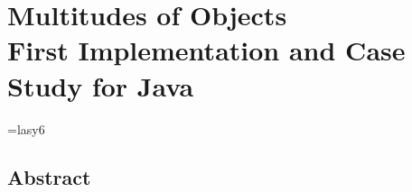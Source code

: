 \chapter[Multitudes of Objects: First Implementation and Case Study for Java]{\texorpdfstring{%
Multitudes of Objects\\{\Large{}First Implementation and Case Study for Java}}{%
Concurrent Evaluation of Reference Attribute Grammars}}
\label{ch:multiplicities}
\paperRemark{\paperIIref}


{

\makeatletter
\def\uwavered{\bgroup \markoverwith{\lower3.5\p@\hbox{\sixly \textcolor{red}{\char58}}}\ULon}
\font\sixly=lasy6 %
\makeatother

%

\makeatletter
\newenvironment{CenteredBox}{%
\begin{Sbox}}{%
\end{Sbox}\centerline{\parbox{\wd\@Sbox}{\TheSbox}}}%
\makeatother

\def\something{\ldots}


\newcommand{\g}[1]{\adjustbox{bgcolor=lightgray}{\strut{}#1}}
\newcommand{\f}[1]{\textbf{#1}}

\usetikzlibrary{matrix,shapes.multipart,trees,calc,arrows}

\renewcommand*{\sectionautorefname}{Section}
\renewcommand*{\subsectionautorefname}{Section}
\renewcommand*{\subsubsectionautorefname}{Section}

\section*{Abstract}

}
